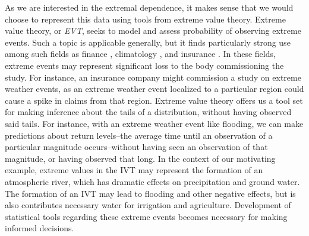 As we are interested in the extremal dependence, it makes sense that we would choose to represent
  this data using tools from extreme value theory.  Extreme value theory, or \emph{EVT}, seeks to
  model and assess probability of observing extreme events.  Such a topic is applicable generally,
  but it finds particularly strong use among such fields as finance \citep{allen2013},
  climatology \citep{trepanier2018}, and insurance \citep{beirlant1994}.  In these fields, extreme
  events may represent significant loss to the body commissioning the study.  For instance, an
  insurance company might commission a study on extreme weather events, as an extreme weather event
  localized to a particular region could cause a spike in claims from that region.  Extreme value
  theory offers us a tool set for making inference about the tails of a distribution, without having
  observed said tails.  For
  instance, with an extreme weather event like flooding, we can make predictions about return
  levels--the average time until an observation of a particular magnitude occurs--without having seen
  an observation of that magnitude, or having observed that long.  In the context of our motivating
  example, extreme values in the IVT may represent the formation of an atmospheric river, which has
  dramatic effects on precipitation and ground water.  The formation of an IVT may lead to flooding
  and other negative effects, but is also contributes necessary water for irrigation and agriculture.
  Development of statistical tools regarding these extreme events becomes necessary for making informed
  decisions.

